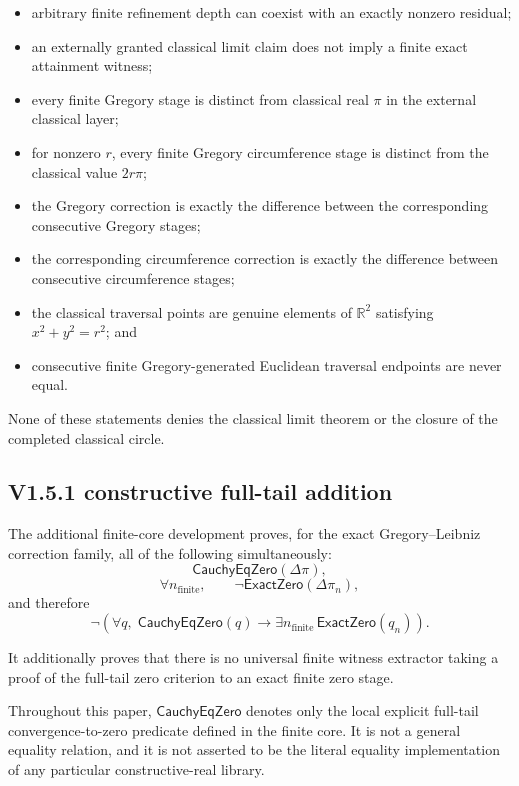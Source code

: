 \documentclass[11pt,a4paper]{article}
\begin{document}
\begin{itemize}
\item arbitrary finite refinement depth can coexist with an exactly
      nonzero residual;
\item an externally granted classical limit claim does not imply a
      finite exact attainment witness;
\item every finite Gregory stage is distinct from classical real
      $\pi$ in the external classical layer;
\item for nonzero $r$, every finite Gregory circumference stage is
      distinct from the classical value $2r\pi$;
\item the Gregory correction is exactly the difference between the
      corresponding consecutive Gregory stages;
\item the corresponding circumference correction is exactly the
      difference between consecutive circumference stages;
\item the classical traversal points are genuine elements of
      $\mathbb R^2$ satisfying $x^2+y^2=r^2$; and
\item consecutive finite Gregory-generated Euclidean traversal
      endpoints are never equal.
\end{itemize}

None of these statements denies the classical limit theorem or the
closure of the completed classical circle.



\subsection*{V1.5.1 constructive full-tail addition}

The additional finite-core development proves, for the exact
Gregory--Leibniz correction family, all of the following simultaneously:
\[
\mathsf{CauchyEqZero}(\Delta\pi),
\]
\[
\forall n_{\mathrm{finite}},
\qquad
\neg\mathsf{ExactZero}(\Delta\pi_n),
\]
and therefore
\[
\neg\left(
\forall q,\;
\mathsf{CauchyEqZero}(q)
\rightarrow
\exists n_{\mathrm{finite}}\,
\mathsf{ExactZero}(q_n)
\right).
\]

It additionally proves that there is no universal finite witness
extractor taking a proof of the full-tail zero criterion to an exact
finite zero stage.

Throughout this paper, \(\mathsf{CauchyEqZero}\) denotes only the
local explicit full-tail convergence-to-zero predicate defined in the
finite core. It is not a general equality relation, and it is not
asserted to be the literal equality implementation of any particular
constructive-real library.
\end{document}
